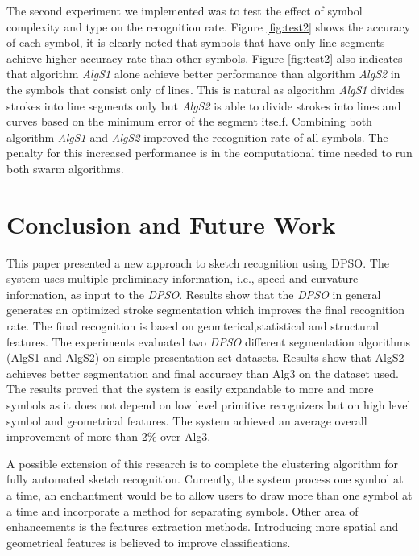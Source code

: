 \documentclass{article}
\begin{document}
The second experiment we implemented was to test the effect of symbol complexity and type on the recognition rate. Figure \ref{fig:test2} shows the accuracy of each symbol, it is clearly noted that symbols that have only line segments achieve higher accuracy rate than other symbols. Figure \ref{fig:test2} also indicates that algorithm \textsl{AlgS1} alone achieve better performance than algorithm   \textsl{AlgS2} in the symbols that consist only of lines. This is natural as algorithm \textsl{AlgS1} divides strokes into line segments only but \textsl{AlgS2} is able to divide strokes into lines and curves based on the minimum error of the segment itself.  
 Combining both algorithm \textsl{AlgS1} and \textsl{AlgS2} improved the recognition rate of all symbols. The penalty for this increased performance is in the computational time needed to run both swarm algorithms. 
\section{Conclusion and Future Work}
\label{ConclusionandFutureWork}
This paper presented a new approach to sketch recognition using DPSO. The system uses multiple preliminary information, i.e., speed and curvature information, as input to the \textit{DPSO}. Results show that the \textit{DPSO} in general generates an optimized stroke segmentation which improves the final recognition rate.  The final recognition is based on geomterical,statistical and structural features. The experiments evaluated two \textit{DPSO} different segmentation algorithms (AlgS1 and AlgS2) on simple presentation set datasets. Results show that AlgS2 achieves better segmentation and final accuracy than Alg3 \cite{earlyprocess} on the dataset used. The results proved that the system is easily expandable to more and more symbols as it does not depend on low level primitive recognizers but on high level symbol and geometrical features.  The system achieved an average overall improvement of more than 2\% over Alg3.  

 A possible extension of this research is to complete the clustering algorithm for fully automated sketch recognition. Currently, the system process one symbol at a time, an enchantment would be to allow users to draw more than one symbol at a time and incorporate a method for separating symbols. Other area of enhancements is the features extraction methods. Introducing more spatial and geometrical features is believed to improve classifications.  


\end{document}

